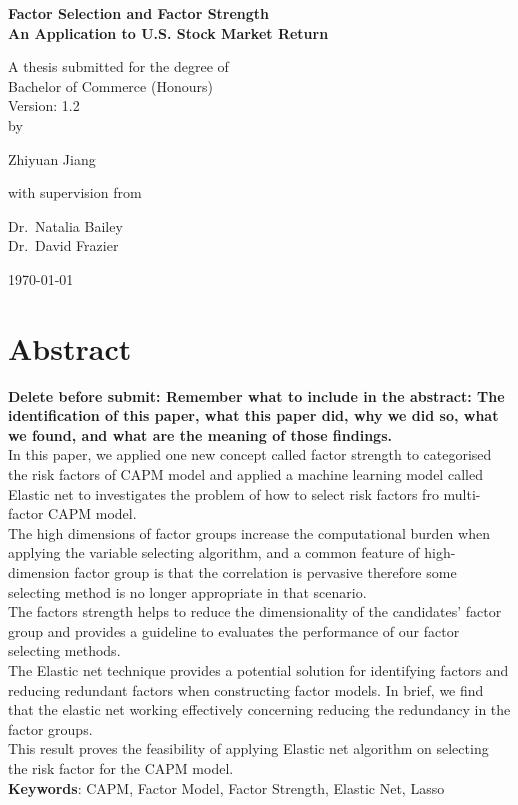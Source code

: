 
\begin{titlepage}
		{\centering

			\vspace{0.5cm}
			{\huge\bfseries Factor Selection and Factor Strength\\
				\Large An Application to U.S. Stock Market Return\par}
			\vspace{1cm}
			{\large A thesis submitted for the degree of\\
			Bachelor of Commerce (Honours)\\}
		\vspace{0.3cm}
		{\LARGE Version: 1.2\\}
		\vspace{1cm}
		{\small by\\}
			{\Large Zhiyuan Jiang\\\par}
\vspace{1cm}
			{\small with supervision from\par}
{\Large			Dr.~Natalia Bailey\\ Dr.~David Frazier\\}


			
			\vfill
		{\centering\large \today\par}}
\end{titlepage}

\chapter*{Abstract}
	\textbf{Delete before submit: Remember what to include in the abstract: The identification of this paper, what this paper did, why we did so, what we found, and what are the meaning of those findings.}\\
In this paper, we applied one new concept called factor strength to categorised the risk factors of CAPM model and applied a machine learning model called Elastic net to investigates the problem of how to select risk factors fro multi-factor CAPM model.\\
The high dimensions of factor groups increase the computational burden when applying the variable selecting algorithm, and a common feature of high-dimension factor group is that the correlation is pervasive therefore some selecting method is no longer appropriate in that scenario.\\
The factors strength helps to reduce the dimensionality of the candidates' factor group and provides a guideline to evaluates the performance of our factor selecting methods.\\
The Elastic net technique provides a potential solution for identifying factors and reducing redundant factors when constructing factor models.
In brief, we find that the elastic net working effectively concerning reducing the redundancy in the factor groups.\\
This result proves the feasibility of applying Elastic net algorithm on selecting the risk factor for the CAPM model.  \\
 \textbf{Keywords}: CAPM, Factor Model, Factor Strength, Elastic Net, Lasso


